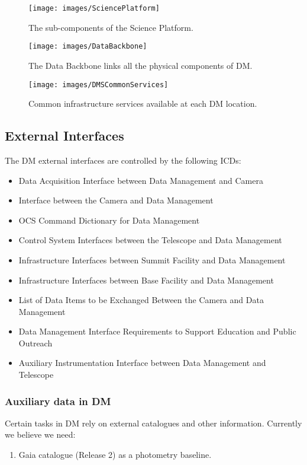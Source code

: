 \begin{figure}[htbp]
\begin{center}
\texttt{[image: images/SciencePlatform]}
\caption{The sub-components of the Science Platform. \label{fig:sciplat}}
\end{center}
\end{figure}


\begin{figure}[htbp]
\begin{center}
\texttt{[image: images/DataBackbone]}
\caption{The Data Backbone links all the physical components of DM. \label{fig:databb}}
\end{center}
\end{figure}

\begin{figure}[htbp]
\begin{center}
 \texttt{[image: images/DMSCommonServices]}
\caption{Common infrastructure services available at each DM location. \label{fig:dcs}}
\end{center}
\end{figure}



\subsection{External Interfaces}
The DM external interfaces are controlled by the following ICDs:
\begin{itemize}
	\item[\citeds{LSE-68}] Data Acquisition Interface between Data Management and Camera
	\item[\citeds{LSE-69}] Interface between the Camera and Data Management	 
	\item[\citeds{LSE-72}] OCS Command Dictionary for Data Management
	\item[\citeds{LSE-75}] Control System Interfaces between the Telescope and Data Management
	\item[\citeds{LSE-76}] Infrastructure Interfaces between Summit Facility and Data Management
	\item[\citeds{LSE-77}] Infrastructure Interfaces between Base Facility and Data Management
	\item[\citeds{LSE-130}] List of Data Items to be Exchanged Between the Camera and Data Management
	\item[\citeds{LSE-131}] Data Management Interface Requirements to Support Education and Public Outreach 
	\item[\citeds{LSE-140}] Auxiliary Instrumentation Interface between Data Management and Telescope
\end{itemize}

\subsubsection{Auxiliary data in DM}
Certain tasks in DM rely on external catalogues and other information. Currently we believe we need:
\begin{enumerate}
		        \item Gaia catalogue (Release 2) as a photometry baseline.
		\end{enumerate}
